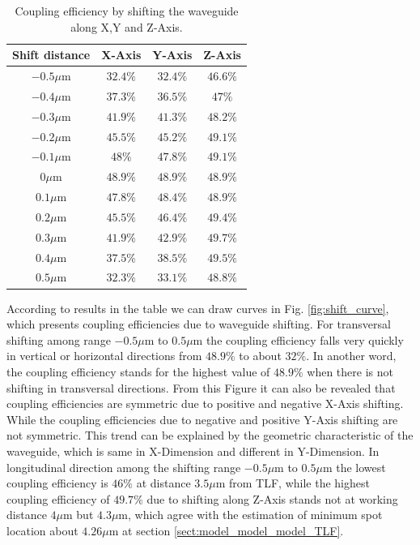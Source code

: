 \begin{table}[!ht]
\caption{Coupling efficiency by shifting the waveguide along X,Y and Z-Axis.}
\centering
\begin{tabular}{c|ccc}
\hline
Shift distance & X-Axis & Y-Axis & Z-Axis \\
\hline
$-0.5\mu$m 		&$32.4\%$	&$32.4\%$&$46.6\%$	\\
$-0.4\mu$m		&$37.3\%$	&$36.5\%$&$47\%$	\\
$-0.3\mu$m 		&$41.9\%$	&$41.3\%$&$48.2\%$	\\
$-0.2\mu$m	  &$45.5\%$	&$45.2\%$&$49.1\%$	\\
$-0.1\mu$m		&$48\%$	&$47.8\%$&$49.1\%$	\\
$0\mu$m			  &$48.9\%$	&$48.9\%$&$48.9\%$	\\
$0.1\mu$m			&$47.8\%$	&$48.4\%$&$48.9\%$	\\
$0.2\mu$m			&$45.5\%$	&$46.4\%$&$49.4\%$	\\
$0.3\mu$m			&$41.9\%$	&$42.9\%$&$49.7\%$	\\
$0.4\mu$m			&$37.5\%$	&$38.5\%$&$49.5\%$	\\
$0.5\mu$m			&$32.3\%$	&$33.1\%$&$48.8\%$	\\
\hline
\end{tabular}
\label{tab:shift_result}
\end{table}
According to results in the table we can draw curves in Fig. \ref{fig:shift_curve}, which presents coupling efficiencies due to waveguide shifting. For transversal shifting among range $-0.5\mu$m to $0.5\mu$m the coupling efficiency falls very quickly in vertical or horizontal directions from $48.9\%$ to about $32\%$.  In another word, the coupling efficiency stands for the highest value of $48.9\%$ when there is not shifting in transversal directions. From this Figure it can also be revealed that coupling efficiencies are symmetric due to positive and negative X-Axis shifting. While the coupling efficiencies due to negative and positive Y-Axis shifting are not symmetric. This trend can be explained by the geometric characteristic of the waveguide, which is same in X-Dimension and different in Y-Dimension.  In longitudinal direction among the shifting range $-0.5\mu$m to $0.5\mu$m the lowest coupling efficiency is $46\%$ at distance $3.5\mu$m from TLF, while the highest coupling efficiency of $49.7\%$ due to shifting along Z-Axis stands not at working distance $4\mu$m but $4.3\mu$m, which agree with the estimation of minimum spot location about $4.26\mu$m at section \ref{sect:model_model_model_TLF}. \\

